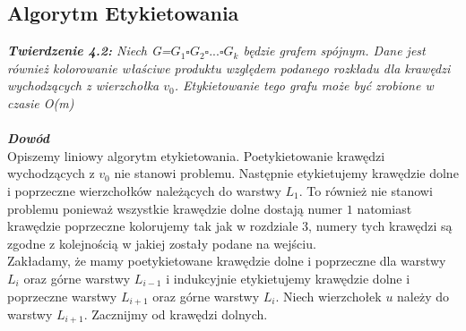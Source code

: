 \documentclass[12pt,a4paper,titlepage]{article}
\begin{document}
\subsection{Algorytm Etykietowania}
\textit{\textbf{Twierdzenie 4.2:} Niech G=$G_1 \square G_2 \square ... \square G_k$ będzie grafem spójnym. Dane jest również kolorowanie właściwe produktu względem podanego rozkładu dla krawędzi wychodzących z wierzchołka $v_0$. Etykietowanie tego grafu może być zrobione w czasie O(m)}\\
\\
\textit{\textbf{Dowód}}\\
Opiszemy liniowy algorytm etykietowania. Poetykietowanie krawędzi wychodzących z $v_0$ nie stanowi problemu. Następnie etykietujemy krawędzie dolne i poprzeczne wierzchołków należących do warstwy $L_1$. To również nie stanowi problemu ponieważ wszystkie krawędzie dolne dostają numer $1$ natomiast krawędzie poprzeczne kolorujemy tak jak w rozdziale 3, numery tych krawędzi są zgodne z kolejnością w jakiej zostały podane na wejściu. \\
Zakładamy, że mamy poetykietowane krawędzie dolne i poprzeczne dla warstwy $L_i$ oraz górne warstwy $L_{i-1}$ i indukcyjnie etykietujemy krawędzie dolne i poprzeczne warstwy $L_{i+1}$ oraz górne warstwy $L_i$. Niech wierzchołek $u$ należy do warstwy $L_{i+1}$. Zacznijmy od krawędzi dolnych. \\
\end{document}
